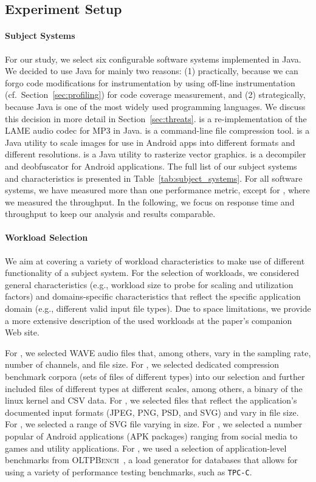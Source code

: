 \subsection{Experiment Setup}\label{sec:setup}
\paragraph*{Subject Systems}
For our study, we select six configurable software systems implemented in Java. We decided to use Java for mainly two reasons: (1) practically, because we can forgo code modifications for instrumentation by using off-line instrumentation (cf.~Section~\ref{sec:profiling}) for code coverage measurement, and (2) strategically, because Java is one of the most widely used programming languages. We discuss this decision in more detail in Section~\ref{sec:threats}. 
\jumper is a re-implementation of the LAME audio codec for MP3 in Java. \kanzi is a command-line file compression tool. \dconvert is a Java utility to scale images for use in Android apps into different formats and different resolutions. \batik is a Java utility to rasterize vector graphics. \jadx is a decompiler and deobfuscator for Android applications. The full list of our subject systems and characteristics is presented in Table~\ref{tab:subject_systems}. 
For all software systems, we have measured more than one performance metric, except for \htwo, where we measured the throughput.  In the following, we focus on response time and throughput to keep our analysis and results comparable.

\paragraph*{Workload Selection}	
We aim at covering a variety of workload characteristics to make use of different functionality of a subject system. 
For the selection of workloads, we considered general characteristics (e.g., workload size to probe for scaling and utilization factors) and domains-specific characteristics that reflect the specific application domain (e.g., different valid input file types).
Due to space limitations, we provide a more extensive description of the used workloads at the paper's companion Web site.

For \jumper, we selected WAVE audio files that, among others, vary in the sampling rate, number of channels, and file size. For \kanzi, we selected dedicated compression benchmark corpora (sets of files of different types) into our selection and further included files of different types at different scales, among others, a binary of the linux kernel and CSV data. For \dconvert, we selected files that reflect the application’s documented input formats (JPEG, PNG, PSD, and SVG) and vary in file size. For \batik, we selected a range of SVG file varying in size. For \jadx, we selected a number popular of Android applications (APK packages) ranging from social media to games and utility applications. For \htwo, we used a selection of application-level benchmarks from \textsc{OLTPBench}~\cite{difallah_oltp_2013}, a load generator for databases that allows for using a variety of performance testing benchmarks, such as \texttt{TPC-C}. 


